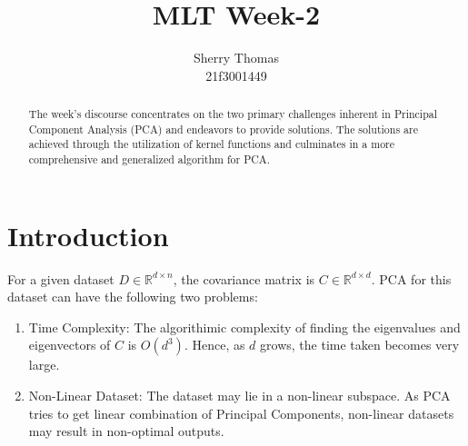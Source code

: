 \documentclass[letterpaper,11pt]{article}
\title{MLT Week-2}
\author{Sherry Thomas \\ 21f3001449}
\begin{document}
\maketitle
\tableofcontents

\begin{abstract}
The week's discourse concentrates on the two primary challenges inherent in Principal Component Analysis (PCA) and endeavors to provide solutions. The solutions are achieved through the utilization of kernel functions and culminates in a more comprehensive and generalized algorithm for PCA.
\end{abstract}

\newpage
\section{Introduction}
For a given dataset $D \in \mathbb{R} ^{d \times n}$, the covariance matrix is $C \in \mathbb{R} ^{d \times d}$. PCA for this dataset can have the following two problems:
\begin{enumerate}
    \item 
    Time Complexity: The algorithimic complexity of finding the eigenvalues and eigenvectors of $C$ is $O(d ^3)$. Hence, as $d$ grows, the time taken becomes very large.
    \item 
    Non-Linear Dataset: The dataset may lie in a non-linear subspace. As PCA tries to get linear combination of Principal Components, non-linear datasets may result in non-optimal outputs.  
\end{enumerate}
\end{document}
